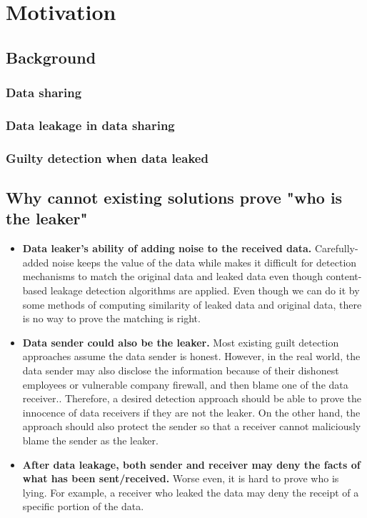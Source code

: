 \section{Motivation}
\subsection{Background}
\subsubsection{Data sharing}

\subsubsection{Data leakage in data sharing}

\subsubsection{Guilty detection when data leaked}

\subsection{Why cannot existing solutions prove "who is the leaker"}

\begin{itemize}
\item \textbf{Data leaker's ability of adding noise to the received data.}
Carefully-added noise keeps the value of the data while makes it difficult for detection mechanisms to match the original data and leaked data even though content-based leakage detection algorithms are applied. Even though we can do it by some methods of computing similarity of leaked data and original data, there is no way to prove the matching is right.

\item \textbf{Data sender could also be the leaker.}
Most existing guilt detection approaches assume the data sender is honest. 
However, in the real world, the data sender may also disclose the information because of their dishonest employees or vulnerable company firewall, and then blame one of the data receiver..
Therefore, a desired detection approach should be able to prove the innocence of data receivers if they are not the leaker.
On the other hand, the approach should also protect the sender so that a receiver cannot maliciously blame the sender as the leaker.

\item \textbf{After data leakage, both sender and receiver may deny the facts of what has been sent/received.}
Worse even, it is hard to prove who is lying.
For example, a receiver who leaked the data may deny the receipt of a specific portion of the data.
\end{itemize}